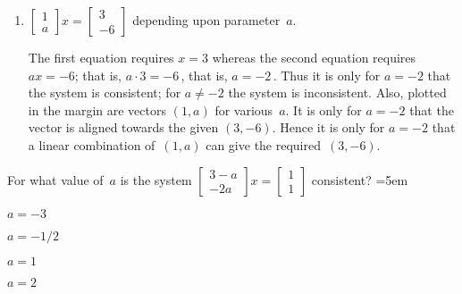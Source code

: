 \begin{example}
\begin{enumerate}
\item \(\begin{bmatrix} 1\\a \end{bmatrix}x
=\begin{bmatrix} 3\\-6 \end{bmatrix}\) depending upon parameter~\(a\).
\begin{solution} 
The first equation requires \(x=3\) whereas the second equation requires \(ax=-6\); that is, \(a\cdot3=-6\)\,, that is, \(a=-2\)\,.
Thus it is only for \(a=-2\) that the system is consistent;
for \(a\neq-2\) the system is inconsistent.
Also, plotted in the margin are vectors \((1,a)\) for various~\(a\).
It is only for \(a=-2\) that the vector is aligned towards the given \((3,-6)\).
Hence it is only for \(a=-2\) that a linear combination of~\((1,a)\) can give the required~\((3,-6)\).
\end{solution}

\end{enumerate}
\end{example}




\begin{activity}
For what value of~\(a\) is the system \(\begin{bmatrix} 3-a\\-2a \end{bmatrix}x=\begin{bmatrix} 1\\1 \end{bmatrix}\) consistent?
\partswidth=5em
\begin{parts}
\item \(a=-3\)
\item \(a=-1/2\)
\item \(a=1\)
\item \(a=2\)
\end{parts}
\end{activity}



